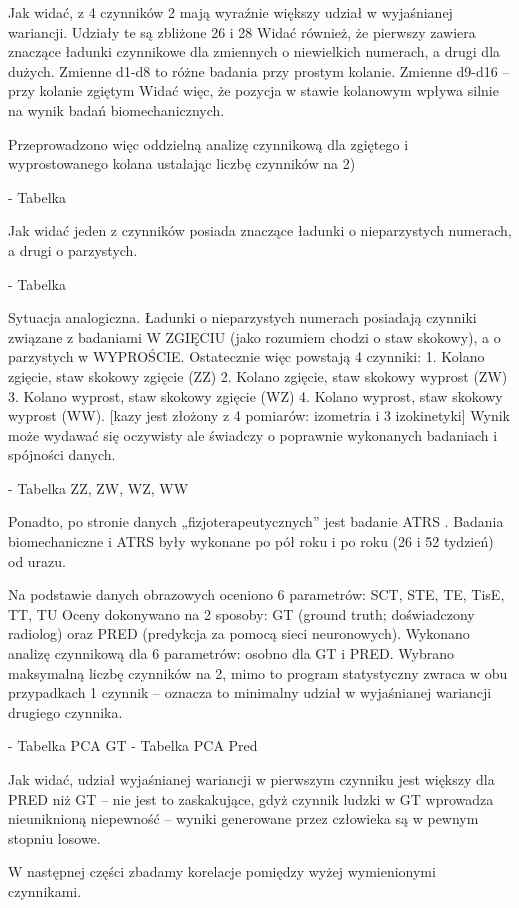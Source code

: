 Jak widać, z 4 czynników 2 mają wyraźnie większy udział w wyjaśnianej wariancji. Udziały te są zbliżone 26 i 28%
Widać również, że pierwszy zawiera znaczące ładunki czynnikowe dla zmiennych o niewielkich numerach, a drugi dla dużych. Zmienne d1-d8 to różne badania przy prostym kolanie. 
Zmienne d9-d16 – przy kolanie zgiętym Widać więc, że pozycja w stawie kolanowym wpływa silnie na wynik badań biomechanicznych. 

Przeprowadzono więc oddzielną analizę czynnikową dla zgiętego i wyprostowanego kolana ustalając liczbę czynników na 2)

- Tabelka

Jak widać jeden z czynników posiada znaczące ładunki o nieparzystych numerach, a drugi o parzystych. 

- Tabelka

Sytuacja analogiczna. 
Ładunki o nieparzystych numerach posiadają czynniki związane z badaniami W ZGIĘCIU (jako rozumiem chodzi o staw skokowy), a o parzystych w WYPROŚCIE. 
Ostatecznie więc powstają 4 czynniki: 
1. Kolano zgięcie, staw skokowy zgięcie  (ZZ)
2. Kolano zgięcie, staw skokowy wyprost (ZW)
3. Kolano wyprost, staw skokowy zgięcie (WZ)
4. Kolano wyprost, staw skokowy wyprost (WW).
[kazy jest złożony z 4 pomiarów: izometria i 3 izokinetyki]
Wynik może wydawać się oczywisty ale świadczy o poprawnie wykonanych badaniach i spójności danych. 

- Tabelka ZZ, ZW, WZ, WW

Ponadto, po stronie danych „fizjoterapeutycznych” jest badanie ATRS .
Badania biomechaniczne i ATRS były wykonane po pół roku i po roku (26 i 52 tydzień) od urazu. 

Na podstawie danych obrazowych oceniono 6 parametrów: 
SCT, STE, TE, TisE, TT, TU
Oceny dokonywano na 2 sposoby: GT (ground truth; doświadczony radiolog) oraz PRED (predykcja za pomocą sieci neuronowych). 
Wykonano analizę czynnikową dla 6 parametrów: osobno dla GT i PRED. 
Wybrano maksymalną liczbę czynników na 2, mimo to program statystyczny zwraca w obu przypadkach 1 czynnik – oznacza to minimalny udział w wyjaśnianej wariancji drugiego czynnika. 

- Tabelka PCA GT
- Tabelka PCA Pred

Jak widać, udział wyjaśnianej wariancji w pierwszym czynniku jest większy dla PRED niż GT – nie jest to zaskakujące, gdyż czynnik ludzki w GT wprowadza nieuniknioną niepewność – wyniki generowane przez człowieka są w pewnym stopniu losowe. 

W następnej części zbadamy korelacje pomiędzy wyżej wymienionymi czynnikami.

